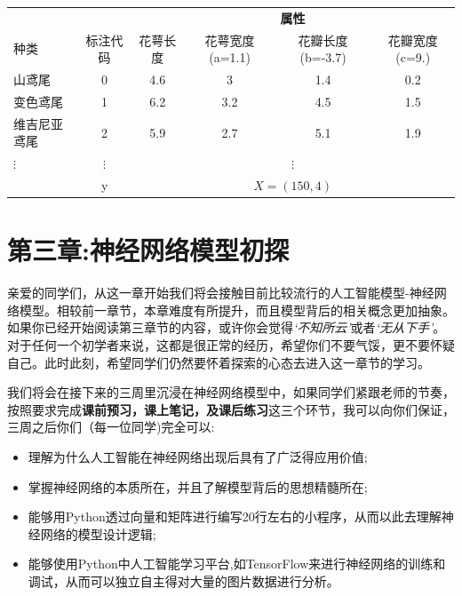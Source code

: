 \documentclass[12pt]{article}
\numberwithin{figure}{section}
\numberwithin{equation}{section}
\begin{document}
\begin{table}[H]
		\centering
		\renewcommand{\arraystretch}{1.2}
		\begin{tabular}{lccccc}
		\hline 
		\hline 
		& & \multicolumn{4}{c}{\textbf{属性}} \\
		\cline{3-6}
			种类 & 标注代码 & 花萼长度 & 花萼宽度(a=1.1) &花瓣长度(b=-3.7) & 花瓣宽度(c=9.) \\
			\hline 
			山鸢尾 & 0 & 4.6 &  3 &  1.4 & 0.2 \\
			变色鸢尾 & 1 & 6.2 &  3.2 & 4.5  & 1.5 \\
			维吉尼亚鸢尾 & 2 & 5.9 &  2.7 &  5.1 & 1.9  \\ 
			$\vdots$ & $\vdots$ & \multicolumn{4}{c}{$\vdots$} \\
			\hline 
			& y & \multicolumn{4}{c}{$X = (150, 4)$} \\
			\hline  
		\end{tabular}
\end{table}
















\newpage
\part*{第三章:神经网络模型初探}


亲爱的同学们，从这一章开始我们将会接触目前比较流行的人工智能模型-神经网络模型。相较前一章节，本章难度有所提升，而且模型背后的相关概念更加抽象。如果你已经开始阅读第三章节的内容，或许你会觉得\textit{`不知所云'}或者\textit{`无从下手'}。 对于任何一个初学者来说，这都是很正常的经历，希望你们不要气馁，更不要怀疑自己。此时此刻，希望同学们仍然要怀着探索的心态去进入这一章节的学习。

我们将会在接下来的三周里沉浸在神经网络模型中，如果同学们紧跟老师的节奏，按照要求完成\textbf{课前预习，课上笔记，及课后练习}这三个环节，我可以向你们保证，三周之后你们（每一位同学)完全可以:
\begin{itemize}
	\item 理解为什么人工智能在神经网络出现后具有了广泛得应用价值;
	\item 掌握神经网络的本质所在，并且了解模型背后的思想精髓所在;
	\item 能够用Python透过向量和矩阵进行编写20行左右的小程序，从而以此去理解神经网络的模型设计逻辑;
	\item 能够使用Python中人工智能学习平台,如TensorFlow来进行神经网络的训练和调试，从而可以独立自主得对大量的图片数据进行分析。
\end{itemize}
\end{document}
